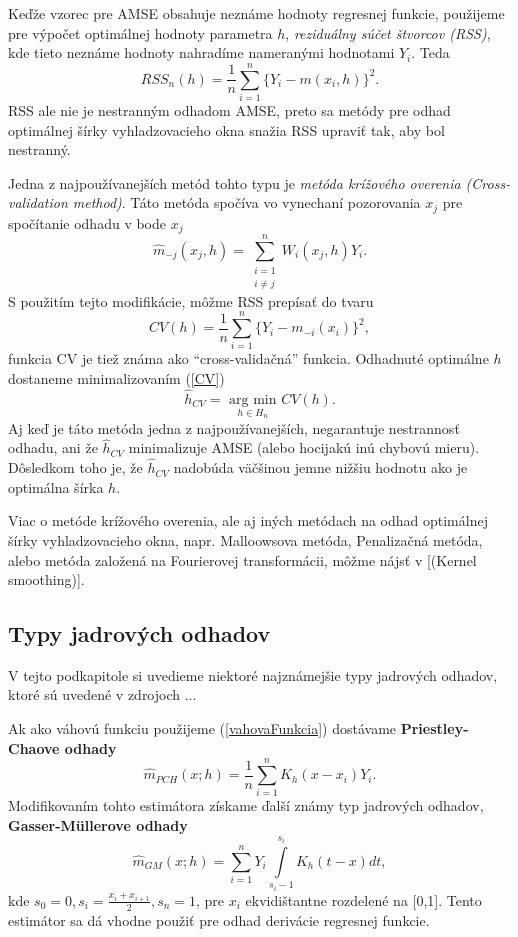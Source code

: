 Keďže vzorec pre AMSE obsahuje neznáme hodnoty regresnej funkcie, použijeme pre výpočet optimálnej hodnoty parametra $h$, \textit{reziduálny súčet štvorcov (RSS)}, kde tieto neznáme hodnoty nahradíme nameranými hodnotami $Y_i$.
Teda
\begin{equation}
 RSS_n(h) = \frac{1}{n}\sum\limits_{i=1}^{n} {\{Y_i - m(x_i,h)\}}^2.
\end{equation}
 RSS ale nie je nestranným odhadom AMSE, preto sa metódy pre odhad optimálnej šírky vyhladzovacieho okna snažia RSS upraviť tak, aby bol nestranný. 
 
 Jedna z najpoužívanejších metód tohto typu je \textit{metóda krížového overenia (Cross-validation method)}. Táto metóda spočíva vo vynechaní pozorovania $x_j$ pre spočítanie odhadu v bode $x_j$
 \begin{equation*}
\hat{m}_{-j}(x_j,h) = \sum\limits_{\substack{i=1 \\ i\neq j}}^{n}W_i(x_j,h)Y_i.
\end{equation*}
S použitím tejto modifikácie, môžme RSS prepísať do tvaru
\begin{equation}\label{CV}
CV(h) = \frac{1}{n}\sum\limits_{i=1}^{n} {\{Y_i - m_{-i}(x_i)\}}^2,
\end{equation}
funkcia CV je tiež známa ako ``cross-validačná'' funkcia. Odhadnuté optimálne $h$ dostaneme minimalizovaním (\ref{CV})
\begin{equation}
\hat{h}_{CV} = \underset{h \in H_n}{\textrm{ arg min }} CV(h).
\end{equation}
Aj keď je táto metóda jedna z najpoužívanejších, negarantuje nestrannosť odhadu, ani že $\hat{h}_{CV}$ minimalizuje AMSE (alebo hocijakú inú chybovú mieru). Dôsledkom toho je, že $\hat{h}_{CV}$  nadobúda väčšinou jemne nižšiu hodnotu ako je optimálna šírka $h$.

Viac o metóde krížového overenia, ale aj iných metódach na odhad optimálnej šírky vyhladzovacieho okna, napr. Malloowsova metóda, Penalizačná metóda, alebo metóda založená na Fourierovej transformácii, môžme nájsť v [(Kernel smoothing)].
\subsection{Typy jadrových odhadov}
V tejto podkapitole si uvedieme niektoré najznámejšie typy jadrových odhadov, ktoré sú uvedené v zdrojoch ...

Ak ako váhovú funkciu použijeme (\ref{vahovaFunkcia}) dostávame \textbf{Priestley-Chaove odhady}
\begin{equation}
\hat{m}_{PCH}(x;h) = \frac{1}{n} \sum\limits_{i=1}^{n} K_h(x - x_i)Y_i.
\end{equation}
Modifikovaním tohto estimátora získame ďalší známy typ jadrových odhadov, \textbf{Gasser-Müllerove odhady}
\begin{equation}
\hat{m}_{GM}(x;h) = \sum\limits_{i=1}^{n} Y_i \int\limits_{s_i-1}^{s_i}K_h(t-x)dt,
\end{equation}
kde $s_0 = 0 , s_i = \frac{x_i + x_{i+1}}{2}, s_n = 1$, pre $x_i$ ekvidištantne rozdelené na [0,1]. Tento estimátor sa dá vhodne použiť pre odhad derivácie regresnej funkcie.

